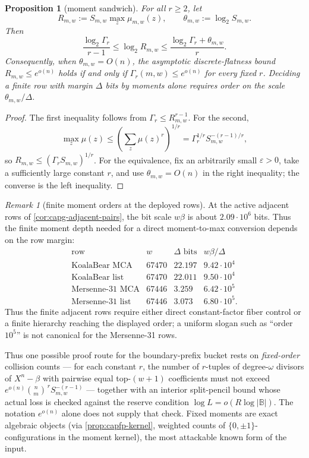 \documentclass[11pt]{article}
\newtheorem{proposition}[proposition]{Proposition}
\theoremstyle{definition}
\theoremstyle{remark}
\newtheorem{remark}[remark]{Remark}
\newcommand{\B}{\mathbb{B}}
\begin{document}
\begin{proposition}[moment sandwich]\label{prop:capfp-Q-sandwich}
For all $r\ge2$, let
\[
        R_{m,w}:=S_{m,w}\max_z\mu_{m,w}(z),
        \qquad \theta_{m,w}:=\log_2S_{m,w}.
\]
Then
\[
        \frac{\log_2\Gamma_r}{r-1}
        \le \log_2R_{m,w}
        \le \frac{\log_2\Gamma_r+\theta_{m,w}}{r}.
\]
Consequently, when $\theta_{m,w}=O(n)$, the asymptotic discrete-flatness bound
$R_{m,w}\le e^{o(n)}$ holds if and only if
$\Gamma_r(m,w)\le e^{o(n)}$ for every fixed $r$.  Deciding a finite row with
margin $\Delta$ bits by moments alone requires order on the scale
$\theta_{m,w}/\Delta$.
\end{proposition}

\begin{proof}
The first inequality follows from
$\Gamma_r\le R_{m,w}^{r-1}$.  For the second,
\[
\max_z\mu(z)\le\left(\sum_z\mu(z)^r\right)^{1/r}
=\Gamma_r^{1/r}S_{m,w}^{-(r-1)/r},
\]
so $R_{m,w}\le(\Gamma_rS_{m,w})^{1/r}$.  For the equivalence, fix an
arbitrarily small $\varepsilon>0$, take a sufficiently large constant $r$, and
use $\theta_{m,w}=O(n)$ in the right inequality; the converse is the left
inequality.
\end{proof}

\begin{remark}[finite moment orders at the deployed rows]\label{rem:capfp-finite-orders}
At the active adjacent rows of \cref{cor:capg-adjacent-pairs}, the bit scale
$w\beta$ is about $2.09\cdot10^6$ bits.  Thus the finite moment depth needed
for a direct moment-to-max conversion depends on the row margin:
\[
\begin{array}{c|c|c|c}
\text{row} & w & \Delta\text{ bits} & w\beta/\Delta \\
\hline
\text{KoalaBear MCA} & 67470 & 22.197 & 9.42\cdot10^4 \\
\text{KoalaBear list} & 67470 & 22.011 & 9.50\cdot10^4 \\
\text{Mersenne-31 MCA} & 67446 & 3.259 & 6.42\cdot10^5 \\
\text{Mersenne-31 list} & 67446 & 3.073 & 6.80\cdot10^5 .
\end{array}
\]
Thus the finite adjacent rows require either direct constant-factor fiber
control or a finite hierarchy reaching the displayed order; a uniform slogan
such as ``order $10^5$'' is not canonical for the Mersenne-31 rows.
\end{remark}

Thus one possible proof route for the boundary-prefix bucket rests on \emph{fixed-order} collision counts --- for each constant $r$, the number of $r$-tuples of degree-$\omega$ divisors of $X^n-\beta$ with pairwise equal top-$(w{+}1)$ coefficients must not exceed $e^{o(n)}\binom nm^{\,r}S_{m,w}^{-(r-1)}$ --- together with an interior split-pencil bound whose actual loss is checked against the reserve condition $\log L=o(R\log|\B|)$.  The notation $e^{o(n)}$ alone does not supply that check.  Fixed moments are exact algebraic objects \textup(via \cref{prop:capfp-kernel}, weighted counts of $\{0,\pm1\}$-configurations in the moment kernel\textup), the most attackable known form of the input.
\end{document}
